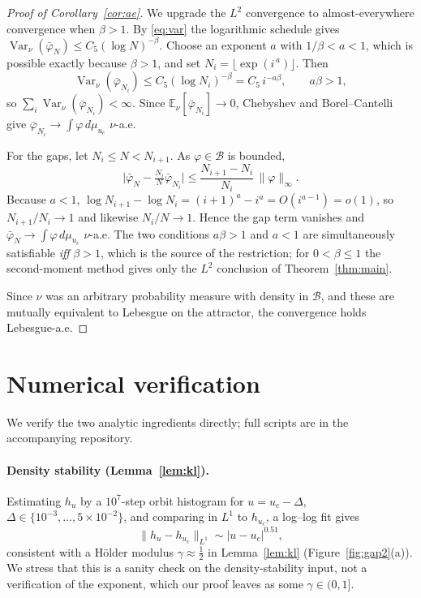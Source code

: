 \documentclass[11pt,a4paper]{article}
\theoremstyle{definition}
\begin{document}
\begin{proof}[Proof of Corollary~\ref{cor:ae}]
We upgrade the $L^2$ convergence to almost-everywhere convergence when
$\beta>1$. By \eqref{eq:var} the logarithmic schedule gives
$\operatorname{Var}_\nu(\bar\varphi_N) \le C_5(\log N)^{-\beta}$. Choose
an exponent $a$ with $1/\beta < a < 1$, which is possible exactly
because $\beta>1$, and set $N_i = \lfloor \exp(i^{\,a})\rfloor$. Then
\[
  \operatorname{Var}_\nu(\bar\varphi_{N_i})
  \le C_5 (\log N_i)^{-\beta} = C_5\, i^{-a\beta},
  \qquad a\beta>1,
\]
so $\sum_i \operatorname{Var}_\nu(\bar\varphi_{N_i})<\infty$. Since
$\mathbb{E}_\nu[\bar\varphi_{N_i}]\to0$, Chebyshev and Borel--Cantelli
give $\bar\varphi_{N_i}\to\int\varphi\,d\mu_{u_c}$ $\nu$-a.e.

For the gaps, let $N_i\le N<N_{i+1}$. As $\varphi\in\mathcal{B}$ is
bounded,
\[
  \bigl|\bar\varphi_N - \tfrac{N_i}{N}\bar\varphi_{N_i}\bigr|
  \le \frac{N_{i+1}-N_i}{N_i}\,\|\varphi\|_\infty.
\]
Because $a<1$,
$\log N_{i+1}-\log N_i = (i+1)^a - i^a = O(i^{a-1}) = o(1)$, so
$N_{i+1}/N_i\to1$ and likewise $N_i/N\to1$. Hence the gap term vanishes
and $\bar\varphi_N\to\int\varphi\,d\mu_{u_c}$ $\nu$-a.e. The two
conditions $a\beta>1$ and $a<1$ are simultaneously satisfiable
\emph{iff} $\beta>1$, which is the source of the restriction; for
$0<\beta\le1$ the second-moment method gives only the $L^2$ conclusion
of Theorem~\ref{thm:main}.

Since $\nu$ was an arbitrary probability measure with density in
$\mathcal{B}$, and these are mutually equivalent to Lebesgue on the
attractor, the convergence holds Lebesgue-a.e.
\end{proof}

\section{Numerical verification}
\label{sec:numerics}

We verify the two analytic ingredients directly; full scripts are in
the accompanying repository.

\paragraph{Density stability (Lemma~\ref{lem:kl}).}
Estimating $h_u$ by a $10^7$-step orbit histogram for
$u = u_c - \Delta$, $\Delta \in \{10^{-3},\dots,5\times10^{-2}\}$,
and comparing in $L^1$ to $h_{u_c}$, a log--log fit gives
\[
  \|h_u - h_{u_c}\|_{L^1} \sim |u - u_c|^{0.51},
\]
consistent with a Hölder modulus $\gamma\approx\tfrac12$ in
Lemma~\ref{lem:kl} (Figure~\ref{fig:gap2}(a)). We stress that this is a
sanity check on the density-stability input, not a verification of the
exponent, which our proof leaves as some $\gamma\in(0,1]$.
\end{document}
